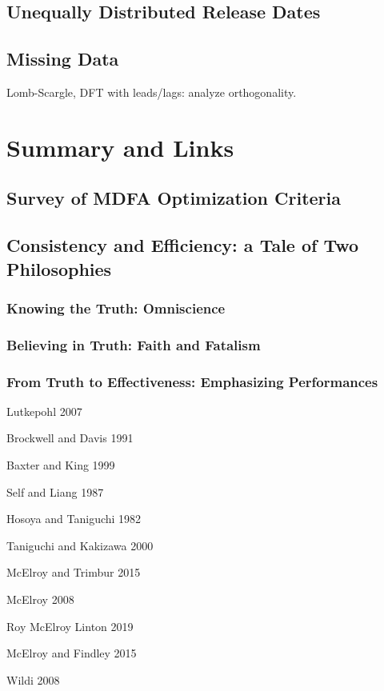 \documentclass[a4paper]{book}
\begin{document}
\section{Unequally Distributed Release Dates}

\section{Missing Data}

Lomb-Scargle, DFT with leads/lags: analyze orthogonality.






\chapter{Summary and Links}

\section{Survey of MDFA Optimization Criteria}

\section{Consistency and Efficiency: a Tale of Two Philosophies}

\subsection{Knowing the Truth: Omniscience}

\subsection{Believing in Truth: Faith and Fatalism}

\subsection{From Truth to Effectiveness: Emphasizing Performances}


\begin{thebibliography}{}


\bibitem{}  Lutkepohl 2007

\bibitem{}  Brockwell and Davis 1991

\bibitem{} Baxter and King 1999

\bibitem{} Self and Liang 1987

\bibitem{} Hosoya and Taniguchi 1982

\bibitem{} Taniguchi and Kakizawa 2000

\bibitem{} McElroy and Trimbur 2015

\bibitem{} McElroy 2008

\bibitem{} Roy McElroy Linton 2019

\bibitem{} McElroy and Findley 2015

\bibitem{} Wildi 2008




\end{thebibliography}
\end{document}

